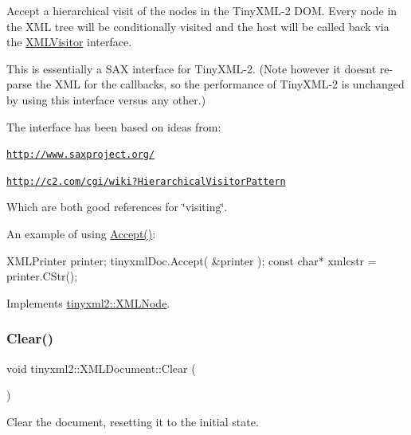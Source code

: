 Accept a hierarchical visit of the nodes in the Tiny\+X\+M\+L-\/2 D\+OM. Every node in the X\+ML tree will be conditionally visited and the host will be called back via the \mbox{\hyperlink{classtinyxml2_1_1_x_m_l_visitor}{X\+M\+L\+Visitor}} interface.

This is essentially a S\+AX interface for Tiny\+X\+M\+L-\/2. (Note however it doesn\textquotesingle{}t re-\/parse the X\+ML for the callbacks, so the performance of Tiny\+X\+M\+L-\/2 is unchanged by using this interface versus any other.)

The interface has been based on ideas from\+:


\begin{DoxyItemize}
\item \href{http://www.saxproject.org/}{\tt http\+://www.\+saxproject.\+org/}
\item \href{http://c2.com/cgi/wiki?HierarchicalVisitorPattern}{\tt http\+://c2.\+com/cgi/wiki?\+Hierarchical\+Visitor\+Pattern}
\end{DoxyItemize}

Which are both good references for \char`\"{}visiting\char`\"{}.

An example of using \mbox{\hyperlink{classtinyxml2_1_1_x_m_l_document_ab7be651917a35ab1ff0e4e6d4e565cdf}{Accept()}}\+: \begin{DoxyVerb}XMLPrinter printer;
tinyxmlDoc.Accept( &printer );
const char* xmlcstr = printer.CStr();
\end{DoxyVerb}
 

Implements \mbox{\hyperlink{classtinyxml2_1_1_x_m_l_node_a81e66df0a44c67a7af17f3b77a152785}{tinyxml2\+::\+X\+M\+L\+Node}}.

\mbox{\label{classtinyxml2_1_1_x_m_l_document_a65656b0b2cbc822708eb351504178aaf}} 
\subsubsection{\texorpdfstring{Clear()}{Clear()}}
{\footnotesize\ttfamily void tinyxml2\+::\+X\+M\+L\+Document\+::\+Clear (\begin{DoxyParamCaption}{ }\end{DoxyParamCaption})}



Clear the document, resetting it to the initial state. 

